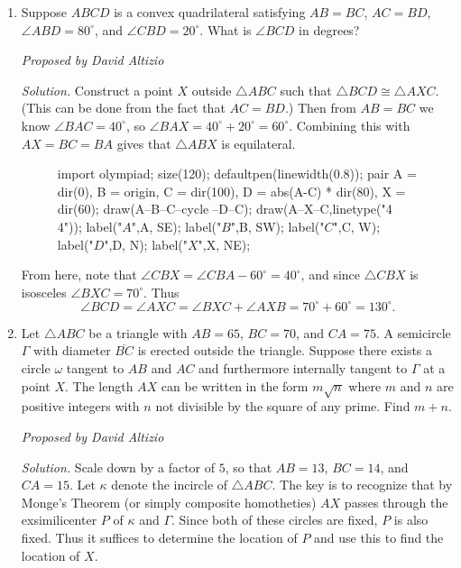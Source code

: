 \documentclass[10pt]{article}
\newcommand{\proposed}[1]
{
\vspace{5pt}
\noindent\textit{Proposed by #1}
}
\newcommand{\solution}
{
\vspace{5pt}
\noindent\textit{Solution.}\qquad
}
\newcounter{enum}
\begin{document}
\begin{enumerate}
\item Suppose $ABCD$ is a convex quadrilateral satisfying $AB=BC$, $AC=BD$, $\angle ABD = 80^\circ$, and $\angle CBD = 20^\circ$.  What is $\angle BCD$ in degrees?

\proposed{David Altizio}

\solution Construct a point $X$ outside $\triangle ABC$ such that $\triangle BCD\cong\triangle AXC$.  (This can be done from the fact that $AC=BD$.)  Then from $AB=BC$ we know $\angle BAC=40^\circ$, so $\angle BAX = 40^\circ+20^\circ = 60^\circ$.  Combining this with $AX=BC=BA$ gives that $\triangle ABX$ is equilateral.

\begin{figure}[h]
	\centering
	\begin{asy}
	import olympiad;
	size(120);
	defaultpen(linewidth(0.8));
	pair A = dir(0), B = origin, C = dir(100), D = abs(A-C) * dir(80), X = dir(60);
	draw(A--B--C--cycle^^B--D--C);
	draw(A--X--C,linetype("4 4"));
	label("$A$",A, SE);
	label("$B$",B, SW);
	label("$C$",C, W);
	label("$D$",D, N);
	label("$X$",X, NE);
\end{asy}
\end{figure}

\par From here, note that $\angle CBX = \angle CBA - 60^\circ=40^\circ$, and since $\triangle CBX$ is isosceles $\angle BXC=70^\circ$.  Thus \[\angle BCD = \angle AXC = \angle BXC + \angle AXB = 70^\circ+60^\circ=\boxed{130^\circ}.\]

\item Let $\triangle ABC$ be a triangle with $AB=65$, $BC=70$, and $CA=75$.  A semicircle $\Gamma$ with diameter $\overline{BC}$ is erected outside the triangle.  Suppose there exists a circle $\omega$ tangent to $AB$ and $AC$ and furthermore internally tangent to $\Gamma$ at a point $X$.  The length $AX$ can be written in the form $m\sqrt{n}$ where $m$ and $n$ are positive integers with $n$ not divisible by the square of any prime.  Find $m+n$.

\proposed{David Altizio}

\solution Scale down by a factor of $5$, so that $AB=13$, $BC=14$, and $CA=15$.  Let $\kappa$ denote the incircle of $\triangle ABC$.  The key is to recognize that by Monge's Theorem (or simply composite homotheties) $AX$ passes through the exsimilicenter $P$ of $\kappa$ and $\Gamma$.  Since both of these circles are fixed, $P$ is also fixed.  Thus it suffices to determine the location of $P$ and use this to find the location of $X$.


\end{enumerate}
\end{document}
